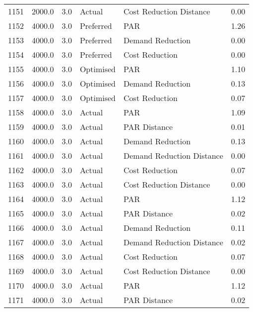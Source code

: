 \begin{longtable}{lrrllr}
1151 &       2000.0 &     3.0 &         Actual &    Cost Reduction Distance &   0.00 \\
1152 &       4000.0 &     3.0 &      Preferred &                        PAR &   1.26 \\
1153 &       4000.0 &     3.0 &      Preferred &           Demand Reduction &   0.00 \\
1154 &       4000.0 &     3.0 &      Preferred &             Cost Reduction &   0.00 \\
1155 &       4000.0 &     3.0 &      Optimised &                        PAR &   1.10 \\
1156 &       4000.0 &     3.0 &      Optimised &           Demand Reduction &   0.13 \\
1157 &       4000.0 &     3.0 &      Optimised &             Cost Reduction &   0.07 \\
1158 &       4000.0 &     3.0 &         Actual &                        PAR &   1.09 \\
1159 &       4000.0 &     3.0 &         Actual &               PAR Distance &   0.01 \\
1160 &       4000.0 &     3.0 &         Actual &           Demand Reduction &   0.13 \\
1161 &       4000.0 &     3.0 &         Actual &  Demand Reduction Distance &   0.00 \\
1162 &       4000.0 &     3.0 &         Actual &             Cost Reduction &   0.07 \\
1163 &       4000.0 &     3.0 &         Actual &    Cost Reduction Distance &   0.00 \\
1164 &       4000.0 &     3.0 &         Actual &                        PAR &   1.12 \\
1165 &       4000.0 &     3.0 &         Actual &               PAR Distance &   0.02 \\
1166 &       4000.0 &     3.0 &         Actual &           Demand Reduction &   0.11 \\
1167 &       4000.0 &     3.0 &         Actual &  Demand Reduction Distance &   0.02 \\
1168 &       4000.0 &     3.0 &         Actual &             Cost Reduction &   0.07 \\
1169 &       4000.0 &     3.0 &         Actual &    Cost Reduction Distance &   0.00 \\
1170 &       4000.0 &     3.0 &         Actual &                        PAR &   1.12 \\
1171 &       4000.0 &     3.0 &         Actual &               PAR Distance &   0.02 \\

\end{longtable}
